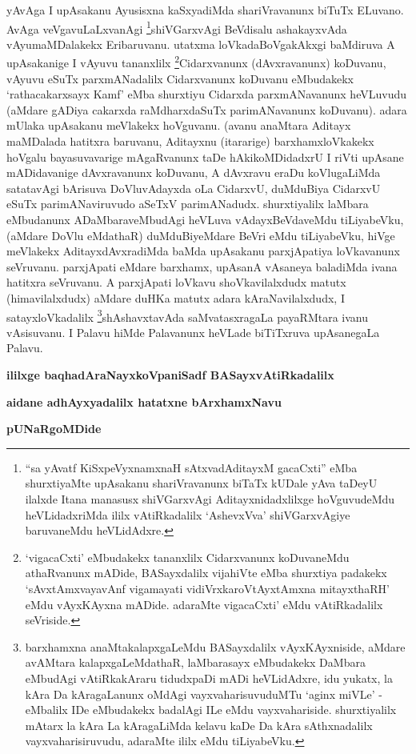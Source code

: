 \begin{artha}
yAvAga I upAsakanu Ayusisxna kaSxyadiMda shariVravanunx biTuTx ELuvano. AvAga veVgavuLaLxvanAgi \footnote{``sa yAvatf KiSxpeVyxnamxnaH sAtxvadAditayxM gacaCxti'' eMba shurxtiyaMte upAsakanu shariVravanunx biTaTx kUDale yAva taDeyU ilalxde Itana manasusx shiVGarxvAgi Aditayxnidadxlilxge hoVguvudeMdu heVLidadxriMda ililx vAtiRkadalilx `AshevxVva' shiVGarxvAgiye baruvaneMdu heVLidAdxre.}shiVGarxvAgi BeVdisalu ashakayxvAda vAyumaMDalakekx Eribaruvanu. utatxma loVkada\break BoVgakAkxgi baMdiruva A upAsakanige I vAyuvu tananxlilx \footnote{`vigacaCxti' eMbudakekx tananxlilx Cidarxvanunx koDuvaneMdu athaRvanunx mADide, BASayxdalilx vija{\null}hiVte eMba shurxtiya padakekx `sAvxtAmxvayavAnf vigamayati vidiVrxkaroVtAyxtAmxna mitayxthaRH' eMdu vAyxKAyxna mADide. adaraMte vigacaCxti' eMdu vAtiRkadalilx seVriside.}Cidarxvanunx (dAvxravanunx) koDuvanu, vAyuvu eSuTx parxmANadalilx Cidarxvanunx koDuvanu eMbudakekx `rathacakarxsayx Kamf' eMba shurxtiyu Cidarxda parxmANavanunx heVLuvudu (aMdare gADiya cakarxda raMdharxdaSuTx parimANavanunx koDuvanu). adara mUlaka upAsakanu meVlakekx hoVguvanu. (avanu anaMtara Aditayx maMDalada hatitxra baruvanu, Aditayxnu (itararige) barxhamxloVkakekx hoVgalu bayasuvavarige mAgaRvanunx taDe hAkikoMDidadxrU I riVti upAsane mADidavanige dAvxravanunx koDuvanu, A dAvxravu eraDu koVlugaLiMda satatavAgi bArisuva DoVluvAdayxda oLa CidarxvU, duMduBiya CidarxvU eSuTx parimANaviruvudo aSeTxV parimANadudx. shurxtiyalilx laMbara eMbudanunx ADaMbaraveMbudAgi heVLuva vAdayxBeVdaveMdu tiLiyabeVku, (aMdare DoVlu eMdathaR) duMduBiyeMdare BeVri eMdu tiLiyabeVku, hiVge meVlakekx AditayxdAvxradiMda baMda upAsakanu parxjApatiya loVkavanunx seVruvanu. parxjApati eMdare barxhamx, upAsanA vAsaneya baladiMda ivana hatitxra seVruvanu. A parxjApati loVkavu shoVkavilalxdudx matutx (himavilalxdudx) aMdare duHKa matutx adara kAraNavilalxdudx, I satayxloVkadalilx \footnote{barxhamxna anaMtakalapxgaLeMdu BASayxdalilx vAyxKAyxniside, aMdare avAMtara kalapxgaLeMdathaR, laMbarasayx eMbudakekx DaMbara eMbudAgi vAtiRkakAraru tidudxpaDi mADi heVLidAdxre, idu yukatx, la kAra Da kAragaLanunx oMdAgi vayxvaharisuvuduMTu `aginx miVLe' - eMbalilx IDe eMbudakekx badalAgi ILe eMdu vayxvahariside. shurxtiyalilx mAtarx la kAra La kAragaLiMda kelavu kaDe Da kAra sAthxnadalilx vayxvaharisiruvudu, adaraMte ililx eMdu tiLiyabeVku.}shAshavxtavAda saMvatasxragaLa payaRMtara ivanu vAsisuvanu. I Palavu hiMde Palavanunx heVLade biTiTxruva upAsanegaLa Palavu.
\end{artha}

\begin{center}
{\bf ililxge baqhadAraNayxkoVpaniSadf BASayxvAtiRkadalilx}
\smallskip

{\bf aidane adhAyxyadalilx hatatxne bArxhamxNavu}

{\bf pUNaRgoMDide}
\end{center}

